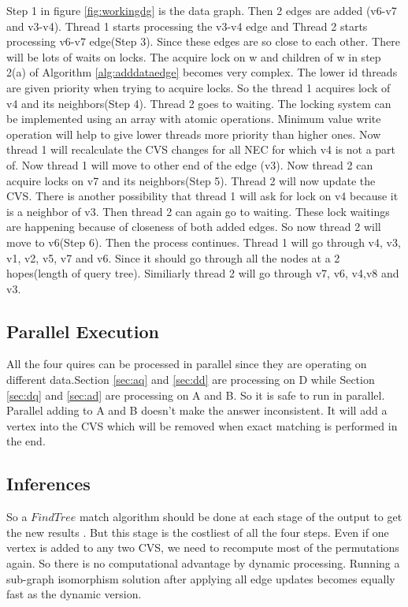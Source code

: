 \par Step 1 in figure \ref{fig:workingdg} is the data graph. Then 2 edges are added (v6-v7 and  v3-v4). Thread 1 starts processing the v3-v4 edge and Thread 2 starts processing v6-v7 edge(Step 3). Since these edges are so close to each other. There will be lots of waits on locks. The acquire lock on w and children of w in step 2(a) of Algorithm \ref{alg:adddataedge} becomes very complex. The lower id threads are given priority when trying to acquire locks. So the thread 1 acquires lock of v4 and its neighbors(Step 4). Thread 2 goes to waiting. The locking system can be implemented using an array with atomic operations. Minimum value write operation will help to give lower threads more priority than higher ones. Now thread 1 will recalculate the CVS changes for all NEC for which v4 is not a part of. Now thread 1 will move to other end of the edge (v3). Now thread 2 can acquire locks on v7 and its neighbors(Step 5). Thread 2 will now update the CVS. There is another possibility that thread 1 will ask for lock on v4 because it is a neighbor of v3. Then thread 2 can again go to waiting. These lock waitings are happening because of closeness of both added edges. So now thread 2 will move to v6(Step 6). Then the process continues. Thread 1 will go through v4, v3, v1, v2, v5, v7 and v6. Since it should go through all the nodes at a 2 hopes(length of query tree). Similiarly thread 2 will go through v7, v6, v4,v8 and v3.
\subsection{Parallel Execution}
\hspace{10mm} All the four quires can be processed in parallel since they are operating on different data.Section \ref{sec:aq} and \ref{sec:dd} are processing on D while Section \ref{sec:dq} and \ref{sec:ad} are processing on A and B. So it is safe to run in parallel. Parallel adding to A and B doesn't make the answer inconsistent. It will add a vertex into the CVS which  will be removed when exact matching is performed in the end.
\subsection{Inferences}
	\hspace{10mm} So a $Find Tree$ match algorithm should be done at each stage of the output to get the new results . But this stage is the costliest of all the four steps. Even if one vertex is added to any two CVS, we need to recompute most of the permutations again. So there is no computational advantage by dynamic processing. Running a sub-graph isomorphism solution after applying all edge updates becomes equally fast as the dynamic version. 
